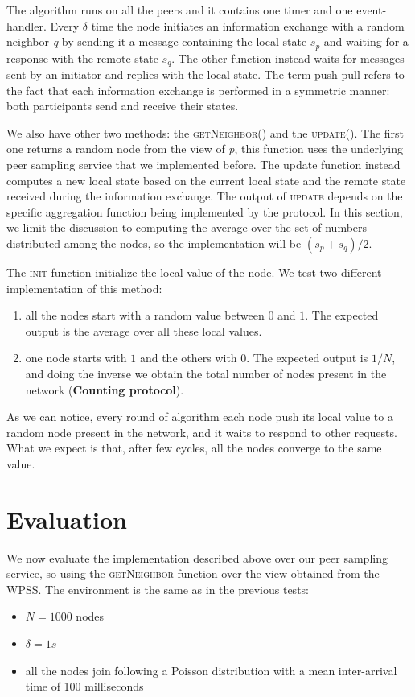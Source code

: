The algorithm runs on all the peers and it contains one timer and one event-handler. Every $\delta$ time the node initiates an information exchange with a random neighbor \textit{q} by sending it a message containing the local state $s_p$ and waiting for a response with the remote state $s_q$. The other function instead waits for messages sent by an initiator and replies with the local state. The term push-pull refers to the fact that each information exchange is performed in a symmetric manner: both participants send and receive their states.

We also have other two methods: the \textsc{getNeighbor()} and the \textsc{update()}. The first one returns a random node from the view of \textit{p}, this function uses the underlying peer sampling service that we implemented before. The update function instead computes a new local state based on the current local state and the remote state received during the information exchange. The output of \textsc{update} depends on the specific aggregation function being implemented by the protocol. In this section, we limit the discussion to computing the average over the set of numbers distributed among the nodes, so the implementation will be $(s_p + s_q) / 2$. 

The \textsc{init} function initialize the local value of the node. We test two different implementation of this method: 
\begin{enumerate}
	\item all the nodes start with a random value between $0$ and $1$. The expected output is the average over all these local values.
	\item one node starts with $1$ and the others with $0$. The expected output is $1/N$, and doing the inverse we obtain the total number of nodes present in the network (\textbf{Counting protocol}).
\end{enumerate}

As we can notice, every round of algorithm each node push its local value to a random node present in the network, and it waits to respond to other requests. What we expect is that, after few cycles, all the nodes converge to the same value. 

\section{Evaluation}
\label{sec:evaluation_aggregation}
We now evaluate the implementation described above over our peer sampling service, so using the \textsc{getNeighbor} function over the view obtained from the WPSS. The environment is the same as in the previous tests:
\begin{itemize}
	\item $N = 1000$ nodes
	\item $\delta = 1s$
	\item all the nodes join following a Poisson distribution with a mean inter-arrival time of 100 milliseconds
\end{itemize}

